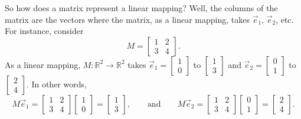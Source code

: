 So how does a matrix represent a linear mapping?
Well, the columns of the matrix are the vectors where the matrix,
as a linear
mapping, takes $\vec{e}_1$, $\vec{e}_2$, etc.
For instance, consider
\begin{equation*}
M = 
\begin{bmatrix}
1 & 2 \\ 3 & 4
\end{bmatrix} .
\end{equation*}
As a linear mapping, $M \colon {\mathbb R}^2 \to {\mathbb R}^2$ takes
$\vec{e}_1 = \left[ \begin{smallmatrix} 1 \\ 0 \end{smallmatrix} \right]$ to
$\left[ \begin{smallmatrix} 1 \\ 3 \end{smallmatrix} \right]$
and
$\vec{e}_2 = \left[ \begin{smallmatrix} 0 \\ 1 \end{smallmatrix} \right]$ to
$\left[ \begin{smallmatrix} 2 \\ 4 \end{smallmatrix} \right]$.  In other
words,
\begin{equation*}
M \vec{e}_1 =
\begin{bmatrix}
1 & 2 \\ 3 & 4
\end{bmatrix}
\begin{bmatrix}
1 \\ 0
\end{bmatrix}
=
\begin{bmatrix}
1 \\ 3
\end{bmatrix},
\qquad
\text{and}
\qquad
M \vec{e}_2 =
\begin{bmatrix}
1 & 2 \\ 3 & 4
\end{bmatrix}
\begin{bmatrix}
0 \\ 1
\end{bmatrix}
=
\begin{bmatrix}
2 \\ 4
\end{bmatrix}.
\end{equation*}

